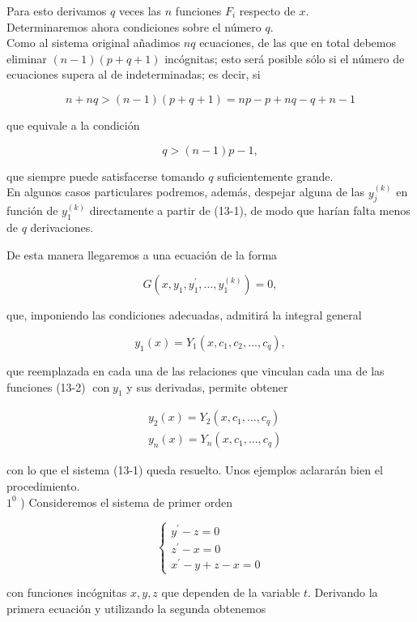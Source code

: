 \documentclass[10pt]{article}
\theoremstyle{plain}
\theoremstyle{definition}
\theoremstyle{remark}
\begin{document}
Para esto derivamos $q$ veces las $n$ funciones $F_{i}$ respecto de $x$.\\
Determinaremos ahora condiciones sobre el número $q$.\\
Como al sistema original añadimos $n q$ ecuaciones, de las que en total debemos eliminar $(n-1)(p+q+1)$ incógnitas; esto será posible sólo si el número de ecuaciones supera al de indeterminadas; es decir, si

$$
n+n q>(n-1)(p+q+1)=n p-p+n q-q+n-1
$$

que equivale a la condición

$$
q>(n-1) p-1,
$$

que siempre puede satisfacerse tomando $q$ suficientemente grande.\\
En algunos casos particulares podremos, además, despejar alguna de las $y_{j}^{(k)}$ en función de $y_{1}^{(k)}$ directamente a partir de (13-1), de modo que harían falta menos de $q$ derivaciones.

De esta manera llegaremos a una ecuación de la forma

$$
G\left(x, y_{1}, y_{1}^{\prime}, \ldots, y_{1}^{(k)}\right)=0,
$$

que, imponiendo las condiciones adecuadas, admitirá la integral general

$$
y_{1}(x)=Y_{1}\left(x, c_{1}, c_{2}, \ldots, c_{q}\right),
$$

que reemplazada en cada una de las relaciones que vinculan cada una de las funciones (13-2) $\operatorname{con} y_{1}$ y sus derivadas, permite obtener

$$
\begin{aligned}
& y_{2}(x)=Y_{2}\left(x, c_{1}, \ldots, c_{q}\right) \\
& y_{n}(x)=Y_{n}\left(x, c_{1}, \ldots, c_{q}\right)
\end{aligned}
$$

con lo que el sistema (13-1) queda resuelto. Unos ejemplos aclararán bien el procedimiento.\\
$1^{0}$ ) Consideremos el sistema de primer orden

\[
\left\{\begin{array}{l}
y^{\prime}-z=0  \tag{$13\cdot3$}\\
z^{\prime}-x=0 \\
x^{\prime}-y+z-x=0
\end{array}\right.
\]

con funciones incógnitas $x, y, z$ que dependen de la variable $t$. Derivando la primera ecuación y utilizando la segunda obtenemos
\end{document}
